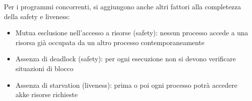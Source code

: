 Per i programmi concorrenti, si aggiungono anche altri fattori alla completezza della safety e liveness:
\begin{itemize}
    \item Mutua esclusione nell'accesso a risorse (safety): nessun processo accede a una risorsa già occupata da un altro processo contemporaneamente
    \item Assenza di deadlock (safety): per ogni esecuzione non si devono verificare situazioni di blocco
    \item Assenza di starvation (liveness): prima o poi ogni processo potrà accedere akke risorse richieste
\end{itemize}


































































